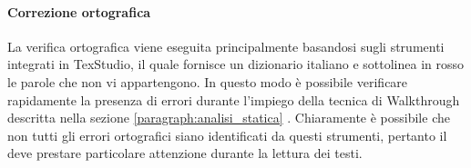 \paragraph{Correzione ortografica}
La verifica ortografica viene eseguita principalmente basandosi sugli strumenti integrati in TexStudio, il quale fornisce un dizionario italiano e sottolinea in rosso le parole che non vi appartengono. In questo modo è possibile verificare rapidamente la presenza di errori durante l'impiego della tecnica di Walkthrough descritta nella sezione \ref{paragraph:analisi_statica} . Chiaramente è possibile che non tutti gli errori ortografici siano identificati da questi strumenti, pertanto il \roleVerifier{} deve prestare particolare attenzione durante la lettura dei testi.



